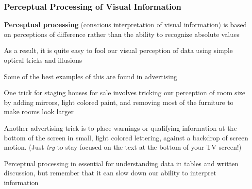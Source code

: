 \documentclass[10pt]{beamer}
\newcommand{\bi}{\begin{itemize}}
\newcommand{\ei}{\end{itemize}}
\begin{document}
\begin{frame}

\frametitle{Perceptual Processing of Visual Information}

\bi 
{\footnotesize
\item {\bf \color{red} Perceptual processing} (conscious interpretation of
  visual information) is based on perceptions of difference rather than the
  ability to recognize absolute values
  
\vspace{1ex}
\item As a result, it is quite easy to fool our visual perception of data
using simple optical tricks and illusions

\vspace{1ex}
\item Some of the best examples of this are found in advertising

   \bi
{\scriptsize
   \item One trick for {\color{blue} staging} houses for sale involves
   tricking our perception of room size by adding mirrors, light colored
   paint, and removing most of the furniture to make rooms look larger

\vspace{1ex}
   \item Another advertising trick is to place warnings or qualifying
   information at the bottom of the screen in small, light colored lettering,
   against a backdrop of screen motion.  (Just {\em try} to stay focused on
   the text at the bottom of your TV screen!)\\
}
\ei

\vspace{1ex}
\item Perceptual processing in essential for understanding data in tables and written discussion,
  but remember that it can slow down our ability to interpret information\\
}
\ei

\end{frame}
\end{document}
